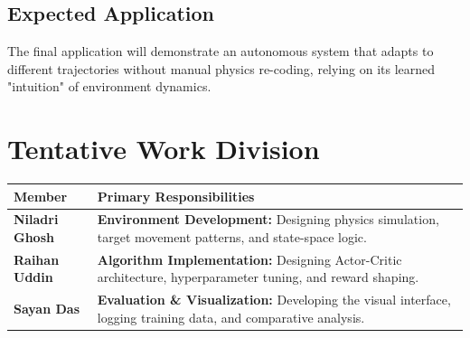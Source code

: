 \documentclass[a4paper,11pt,notitlepage]{report}
\begin{document}
\subsection*{Expected Application}
The final application will demonstrate an autonomous system that adapts to different trajectories without manual physics re-coding, relying on its learned "intuition" of environment dynamics.

\section*{Tentative Work Division}

\begin{table}[h]
    \centering
    \begin{tabular}{lp{10cm}}
        \toprule
        \textbf{Member} & \textbf{Primary Responsibilities} \\
        \midrule
        \textbf{Niladri Ghosh} & \textbf{Environment Development:} Designing physics simulation, target movement patterns, and state-space logic. \\
        \addlinespace
        \textbf{Raihan Uddin} & \textbf{Algorithm Implementation:} Designing Actor-Critic architecture, hyperparameter tuning, and reward shaping. \\
        \addlinespace
        \textbf{Sayan Das} & \textbf{Evaluation \& Visualization:} Developing the visual interface, logging training data, and comparative analysis. \\
        \bottomrule
    \end{tabular}
\end{table}
\end{document}
